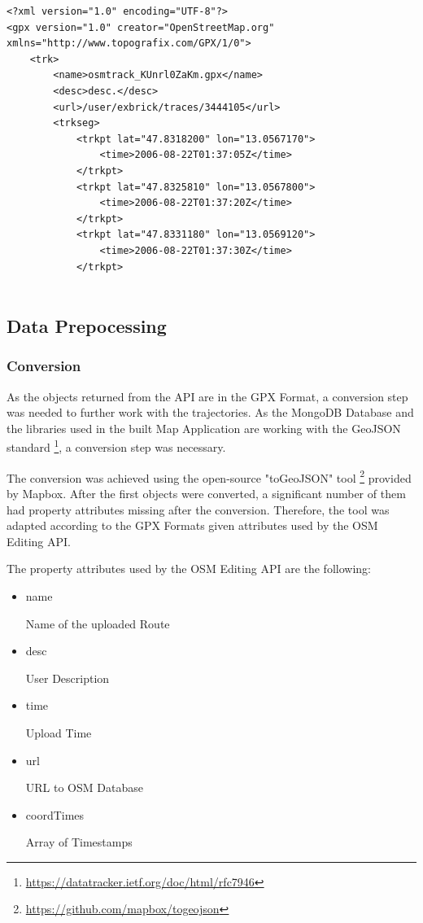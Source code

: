 
\begin{lstlisting}
<?xml version="1.0" encoding="UTF-8"?>
<gpx version="1.0" creator="OpenStreetMap.org" xmlns="http://www.topografix.com/GPX/1/0">
    <trk>
        <name>osmtrack_KUnrl0ZaKm.gpx</name>
        <desc>desc.</desc>
        <url>/user/exbrick/traces/3444105</url>
        <trkseg>
            <trkpt lat="47.8318200" lon="13.0567170">
                <time>2006-08-22T01:37:05Z</time>
            </trkpt>
            <trkpt lat="47.8325810" lon="13.0567800">
                <time>2006-08-22T01:37:20Z</time>
            </trkpt>
            <trkpt lat="47.8331180" lon="13.0569120">
                <time>2006-08-22T01:37:30Z</time>
            </trkpt>
            
\end{lstlisting}

\subsection{Data Prepocessing}

\subsubsection{Conversion}

As the objects returned from the API are in the GPX Format, a conversion step was needed to further work with the trajectories. As the MongoDB Database and the libraries used in the built Map Application are working with the GeoJSON standard \footnote{\url{https://datatracker.ietf.org/doc/html/rfc7946}}, a conversion step was necessary.

The conversion was achieved using the open-source "toGeoJSON" tool \footnote{\url{https://github.com/mapbox/togeojson}} provided by Mapbox. After the first objects were converted, a significant number of them had property attributes missing after the conversion. Therefore, the tool was adapted according to the GPX Formats given attributes used by the OSM Editing API.

The property attributes used by the OSM Editing API are the following:

\begin{itemize}
	\item name
	
	Name of the uploaded Route
	
 	\item desc
 	
 	User Description
 	
 	\item time
 	
 	Upload Time
 	
 	\item url
 	
 	URL to OSM Database
 	
 	\item coordTimes
 	
 	Array of Timestamps
 	
\end{itemize}


